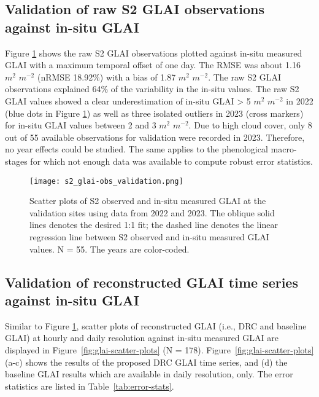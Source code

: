 \subsection{Validation of raw S2 GLAI observations against in-situ GLAI}

Figure \ref{fig:s2-obs-scatter-plots} shows the raw \gls{S2} \gls{GLAI} observations plotted against in-situ measured \gls{GLAI} with a maximum temporal offset of one day. The \gls{RMSE} was about 1.16 $m^2$ $m^{-2}$ (\gls{nRMSE} 18.92\%) with a bias of 1.87 $m^2$ $m^{-2}$. The raw \gls{S2} \gls{GLAI} observations explained 64\% of the variability in the in-situ values. The raw \gls{S2} \gls{GLAI} values showed a clear underestimation of in-situ \gls{GLAI} > 5 $m^2$ $m^{-2}$ in 2022 (blue dots in Figure \ref{fig:s2-obs-scatter-plots}) as well as three isolated outliers in 2023 (cross markers) for in-situ \gls{GLAI} values between 2 and 3 $m^2$ $m^{-2}$. Due to high cloud cover, only 8 out of 55 available observations for validation were recorded in 2023. Therefore, no year effects could be studied. The same applies to the phenological macro-stages for which not enough data was available to compute robust error statistics.

\begin{figure}[H]
    \centering
    \texttt{[image: s2\_glai-obs\_validation.png]}
    \caption{Scatter plots of S2 observed and in-situ measured GLAI at the validation sites using data from 2022 and 2023. The oblique solid lines denotes the desired 1:1 fit; the dashed line denotes the linear regression line between S2 observed and in-situ measured \gls{GLAI} values. N = 55. The years are color-coded.}
    \label{fig:s2-obs-scatter-plots}
\end{figure}

\subsection{Validation of reconstructed GLAI time series against in-situ GLAI}
Similar to Figure \ref{fig:s2-obs-scatter-plots}, scatter plots of reconstructed GLAI (i.e., \gls{DRC} and baseline \gls{GLAI}) at hourly and daily resolution against in-situ measured \gls{GLAI} are displayed in Figure~\ref{fig:glai-scatter-plots} (N = 178). Figure~\ref{fig:glai-scatter-plots} (a-c) shows the results of the proposed \gls{DRC} GLAI time series, and (d) the baseline \gls{GLAI} results which are available in daily resolution, only. The error statistics are listed in Table~\ref{tab:error-stats}.

